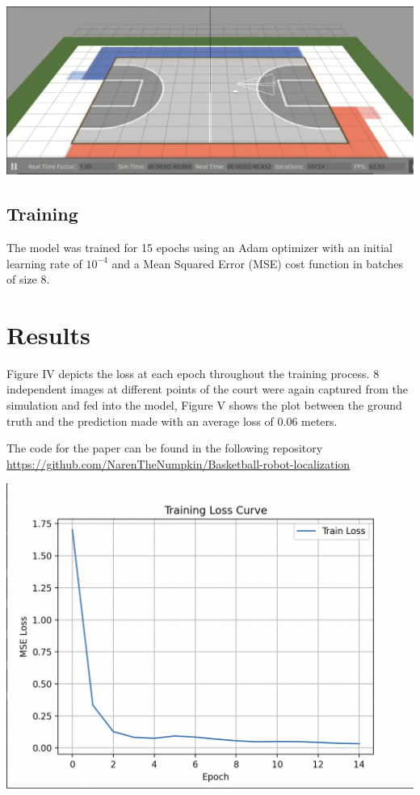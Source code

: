 \documentclass[a4paper]{article}
\begin{document}
\begin{multicols}{2}
{ \centering
 \includegraphics[scale=0.3]{../results/gazebo.png}\\
 \label{pinki}
}

\subsection{Training}
\par \noindent
The model was trained for 15 epochs using an Adam optimizer \cite{kingma2014adam} with an initial learning rate of $10^{-4}$
and a Mean Squared Error (MSE) cost function in batches of size 8. 

\section{Results}
\par \noindent
Figure IV depicts the loss at each epoch throughout the training process.
8 independent images at different points of the court were again captured 
from the simulation and fed into the model, Figure V shows the plot between
the ground truth and the prediction made with an average loss of 0.06 meters.

\par \noindent 
The code for the paper can be found in the following repository
\href{https://github.com/NarenTheNumpkin/Basketball-robot-localization}{https://github.com/NarenTheNumpkin/Basketball-robot-localization}

{ \centering
 \includegraphics[scale=0.3]{../results/loss-epochs.png}\\
 \label{pinki}
}


\end{multicols}
\end{document}
